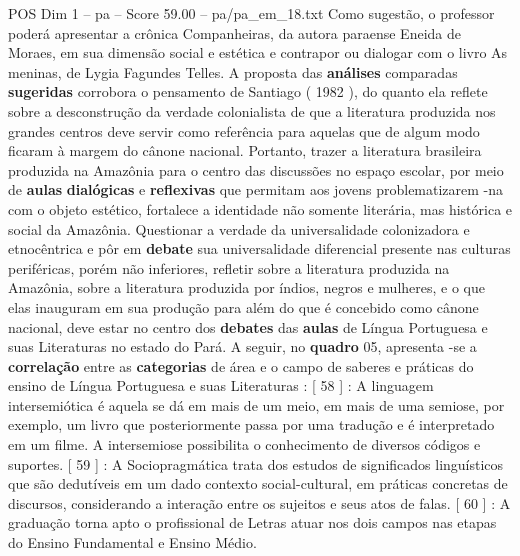 \begin{textsample}{POS Dim 1 – pa – Score 59.00 – pa/pa\_em\_18.txt}
Como sugestão, o professor poderá apresentar a crônica Companheiras, da autora paraense Eneida de Moraes, em sua dimensão social e estética e contrapor ou dialogar com o livro As meninas, de Lygia Fagundes Telles.
A proposta das \textbf{análises} comparadas \textbf{sugeridas} corrobora o pensamento de Santiago ( 1982 ), do quanto ela reflete sobre a desconstrução da verdade colonialista de que a literatura produzida nos grandes centros deve servir como referência para aquelas que de algum modo ficaram à margem do cânone nacional.
Portanto, trazer a literatura brasileira produzida na Amazônia para o centro das discussões no espaço escolar, por meio de \textbf{aulas} \textbf{dialógicas} e \textbf{reflexivas} que permitam aos jovens problematizarem -na com o objeto estético, fortalece a identidade não somente literária, mas histórica e social da Amazônia.
Questionar a verdade da universalidade colonizadora e etnocêntrica e pôr em \textbf{debate} sua universalidade diferencial presente nas culturas periféricas, porém não inferiores, refletir sobre a literatura produzida na Amazônia, sobre a literatura produzida por índios, negros e mulheres, e o que elas inauguram em sua produção para além do que é concebido como cânone nacional, deve estar no centro dos \textbf{debates} das \textbf{aulas} de Língua Portuguesa e suas Literaturas no estado do Pará.
A seguir, no \textbf{quadro} 05, apresenta -se a \textbf{correlação} entre as \textbf{categorias} de área e o campo de saberes e práticas do ensino de Língua Portuguesa e suas Literaturas : [ 58 ] : A linguagem intersemiótica é aquela se dá em mais de um meio, em mais de uma semiose, por exemplo, um livro que posteriormente passa por uma tradução e é interpretado em um filme.
A intersemiose possibilita o conhecimento de diversos códigos e suportes. [ 59 ] : A Sociopragmática trata dos estudos de significados linguísticos que são dedutíveis em um dado contexto social-cultural, em práticas concretas de discursos, considerando a interação entre os sujeitos e seus atos de falas. [ 60 ] : A graduação torna apto o profissional de Letras atuar nos dois campos nas etapas do Ensino Fundamental e Ensino Médio.

\end{textsample}
